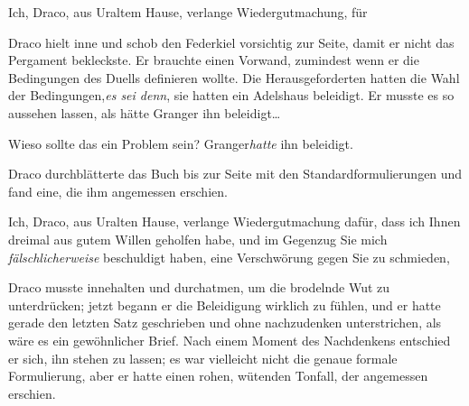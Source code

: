 \begin{writtenNote}
Ich, Draco, aus Uraltem Hause, verlange Wiedergutmachung, für
\end{writtenNote}

Draco hielt inne und schob den Federkiel vorsichtig zur Seite, damit er nicht das Pergament bekleckste. Er brauchte einen Vorwand, zumindest wenn er die Bedingungen des Duells definieren wollte. Die Herausgeforderten hatten die Wahl der Bedingungen,\emph{es sei denn}, sie hatten ein Adelshaus beleidigt. Er musste es so aussehen lassen, als hätte Granger ihn beleidigt…

Wieso sollte das ein Problem sein? Granger\emph{hatte} ihn beleidigt.

Draco durchblätterte das Buch bis zur Seite mit den Standardformulierungen und fand eine, die ihm angemessen erschien.

\begin{writtenNote}
Ich, Draco, aus Uralten Hause, verlange Wiedergutmachung dafür, dass ich Ihnen dreimal aus gutem Willen geholfen habe, und im Gegenzug Sie mich \emph{fälschlicherweise} beschuldigt haben, eine Verschwörung gegen Sie zu schmieden,
\end{writtenNote}

Draco musste innehalten und durchatmen, um die brodelnde Wut zu unterdrücken; jetzt begann er die Beleidigung wirklich zu fühlen, und er hatte gerade den letzten Satz geschrieben und ohne nachzudenken unterstrichen, als wäre es ein gewöhnlicher Brief. Nach einem Moment des Nachdenkens entschied er sich, ihn stehen zu lassen; es war vielleicht nicht die genaue formale Formulierung, aber er hatte einen rohen, wütenden Tonfall, der angemessen erschien.

